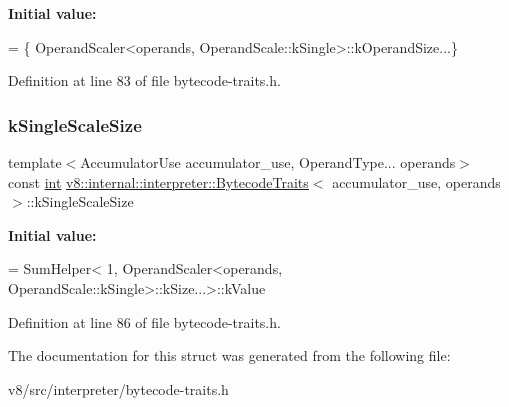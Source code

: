 {\bfseries Initial value\+:}
\begin{DoxyCode}
= \{
        OperandScaler<operands, OperandScale::kSingle>::kOperandSize...\}
\end{DoxyCode}


Definition at line 83 of file bytecode-\/traits.\+h.

\mbox{\label{structv8_1_1internal_1_1interpreter_1_1BytecodeTraits_a3db6a9edc3e8c06ff3cf7d30844c976e}} 
\subsubsection{\texorpdfstring{k\+Single\+Scale\+Size}{kSingleScaleSize}}
{\footnotesize\ttfamily template$<$Accumulator\+Use accumulator\+\_\+use, Operand\+Type... operands$>$ \\
const \mbox{\hyperlink{classint}{int}} \mbox{\hyperlink{structv8_1_1internal_1_1interpreter_1_1BytecodeTraits}{v8\+::internal\+::interpreter\+::\+Bytecode\+Traits}}$<$ accumulator\+\_\+use, operands $>$\+::k\+Single\+Scale\+Size\hspace{0.3cm}{\ttfamily [static]}}

{\bfseries Initial value\+:}
\begin{DoxyCode}
= SumHelper<
      1, OperandScaler<operands, OperandScale::kSingle>::kSize...>::kValue
\end{DoxyCode}


Definition at line 86 of file bytecode-\/traits.\+h.



The documentation for this struct was generated from the following file\+:\begin{DoxyCompactItemize}
\item 
v8/src/interpreter/bytecode-\/traits.\+h\end{DoxyCompactItemize}
